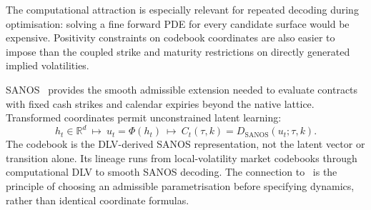 The computational attraction is especially relevant for repeated decoding during optimisation:
solving a fine forward PDE for every candidate surface would be expensive. Positivity constraints
on codebook coordinates are also easier to impose than the coupled strike and maturity restrictions
on directly generated implied volatilities.

SANOS~\cite{SANOS2026} provides the smooth admissible extension needed to evaluate contracts with fixed
cash strikes and calendar expiries beyond the native lattice. Transformed coordinates permit unconstrained latent learning:
\[
h_t\in\mathbb{R}^d\ \longmapsto\ u_t=\Phi(h_t)\ \longmapsto\ C_t(\tau,k)=D_{\mathrm{SANOS}}(u_t;\tau,k).
\]
The codebook is the DLV-derived SANOS representation, not the latent vector or transition alone.
Its lineage runs from local-volatility market codebooks through computational DLV to
smooth SANOS decoding. The connection to~\cite{SchweizerWissel2008} is the principle of choosing an admissible
parametrisation before specifying dynamics, rather than identical coordinate formulas.
